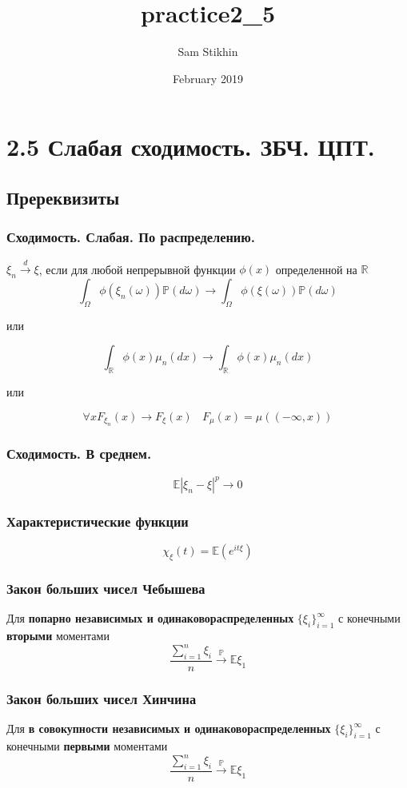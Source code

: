 \documentclass[a4paper, 14pt]{extarticle}
\title{practice2_5}
\author{Sam Stikhin}
\date{February 2019}
\begin{document}
\section*{2.5 Слабая сходимость. ЗБЧ. ЦПТ.}
\subsection*{Пререквизиты}
\subsubsection*{Сходимость. Слабая. По распределению.}
$\xi_n \overset{d}{\to} \xi$, если для любой непрерывной функции $\phi(x)$ определенной на $\mathbb{R}$   
$$\int_{\Omega}\phi(\xi_n(\omega))\mathbb{P}(d\omega) \to \int_{\Omega}\phi(\xi(\omega))\mathbb{P}(d\omega)$$

или

$$\int_{\mathbb{R}}\phi(x)\mu_n(dx) \to \int_{\mathbb{R}}\phi(x)\mu_n(dx)$$

или

$$\forall x F_{\xi_n}(x) \to F_{\xi}(x) ~~~~ F_{\mu}(x) = \mu((-\infty, x))$$


\subsubsection*{Сходимость. В среднем.}
$$\mathbb{E}|\xi_n - \xi|^p \to 0$$

\subsubsection*{Характеристические функции}
$$\chi_\xi(t) = \mathbb{E}(e^{it\xi})$$

\subsubsection*{Закон больших чисел Чебышева}
Для \textbf{попарно независимых и одинаковораспределенных} 
$\{\xi_i\}_{i=1}^{\infty}$ с конечными \textbf{вторыми} моментами
$$\frac{\sum_{i=1}^n\xi_i}{n} \overset{\mathbb{P}}{\to} \mathbb{E}\xi_1$$	

\subsubsection*{Закон больших чисел Хинчина}
Для \textbf{в совокупности независимых и одинаковораспределенных} 
$\{\xi_i\}_{i=1}^{\infty}$ с конечными \textbf{первыми} моментами
$$\frac{\sum_{i=1}^n\xi_i}{n} \overset{\mathbb{P}}{\to} \mathbb{E}\xi_1$$	
\end{document}

